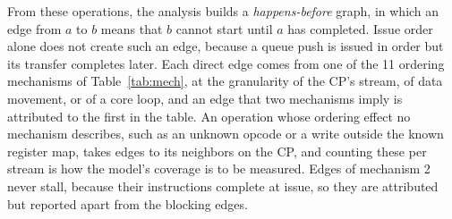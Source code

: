 From these operations, the analysis builds a \emph{happens-before} graph, in which an edge from $a$ to $b$ means that $b$ cannot start until $a$ has completed.
Issue order alone does not create such an edge, because a queue push is issued in order but its transfer completes later.
Each direct edge comes from one of the 11 ordering mechanisms of Table~\ref{tab:mech}, at the granularity of the CP's stream, of data movement, or of a core loop, and an edge that two mechanisms imply is attributed to the first in the table.
An operation whose ordering effect no mechanism describes, such as an unknown opcode or a write outside the known register map, takes edges to its neighbors on the CP, and counting these per stream is how the model's coverage is to be measured.
Edges of mechanism 2 never stall, because their instructions complete at issue, so they are attributed but reported apart from the blocking edges.

